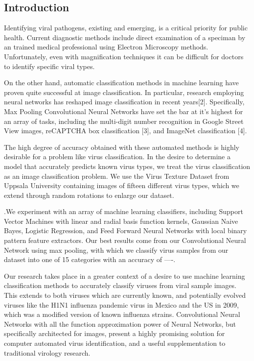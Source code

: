 \begin{multicols}{2}
\section{Introduction}
Identifying viral pathogens, existing and emerging, is a critical priority for public health. Current diagnostic methods include direct examination of a speciman by an trained medical professional using Electron Microscopy methods. Unfortunately, even with magnification techniques it can be difficult for doctors to identify specific viral types. 

On the other hand, automatic classification methods in machine learning have proven quite successful at image classification. In particular, research employing neural networks has reshaped image classification in recent years[2]. Specifically, Max Pooling Convolutional Neural Networks have set the bar at it's highest for an array of tasks, including the multi-digit number recognition in Google Street View images, reCAPTCHA box classification [3], and ImageNet classification [4]. 

The high degree of accuracy obtained with these automated methods is highly desirable for a problem like virus classification. In the desire to determine a model that accurately predicts known virus types, we treat the virus classification as an image classification problem. We use the Virus Texture Dataset from Uppsala University containing images of fifteen different virus types, which we extend through random rotations to enlarge our dataset. 

.We experiment with an array of machine learning classifiers, including Support Vector Machines with linear and radial basis function kernels, Gaussian Naive Bayes, Logistic Regression, and Feed Forward Neural Networks with local binary pattern feature extractors. Our best results come from our Convolutional Neural Network using max pooling, with which we classify virus samples from our dataset into one of 15 categories with an accuracy of ----. 

Our research takes place in a greater context of a desire to use machine learning classification methods to accurately classify viruses from viral sample images. This extends to both viruses which are currently known, and potentially evolved viruses like the H1N1 influenza pandemic virus in Mexico and the US in 2009,  which was a modified version of known influenza strains. Convolutional Neural Networks with all the function approximation power of Neural Networks, but specifically architected for images, present a highly promising solution for computer automated virus identification, and a useful supplementation to traditional virology research. 



\end{multicols}
